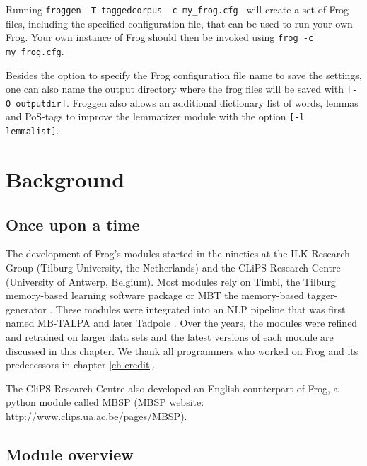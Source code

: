 \documentclass{book}
\begin{document}
Running {\tt froggen -T taggedcorpus -c my\_frog.cfg } will create a set of
Frog files, including the specified configuration file, that can be used to run
your own Frog. Your own instance of Frog should then be invoked using {\tt frog -c my\_frog.cfg}.

Besides the option to specify the Frog configuration file name to save the settings, one can also name the output directory where the frog files will be saved with {\tt [-O outputdir]}.
Froggen also allows an additional dictionary list of words, lemmas and PoS-tags
to improve the lemmatizer module with the option {\tt [-l lemmalist]}.


\chapter{Background}\label{ch-bg}

\section{Once upon a time }

The development of Frog's modules started in the nineties at the ILK Research Group
(Tilburg University, the Netherlands) and the CLiPS Research Centre (University
of Antwerp, Belgium). Most modules rely on Timbl, the Tilburg memory-based learning software
package \cite{timbl} or MBT the memory-based tagger-generator \cite{mbt}.
These modules were integrated into an NLP pipeline that was first named MB-TALPA and later Tadpole \cite{Tadpole}. Over the years, the modules were refined and retrained on larger data sets and the latest versions of each module are discussed in this chapter. We thank all programmers who worked on Frog and its predecessors in chapter \ref{ch-credit}.

The CliPS Research Centre also developed an English counterpart of Frog, a python module called MBSP (MBSP website: \url{http://www.clips.ua.ac.be/pages/MBSP}).

\section{Module overview}
\end{document}
